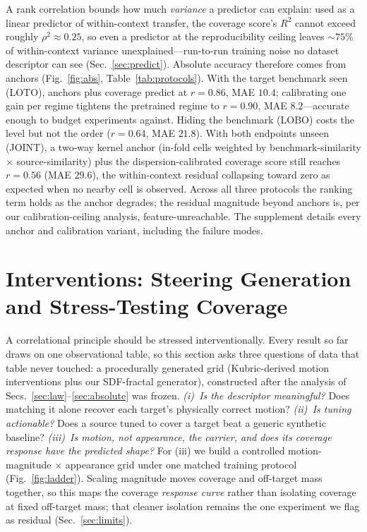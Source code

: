 \documentclass[runningheads]{llncs}
\begin{document}
A rank correlation bounds how much \emph{variance} a predictor can explain: used
as a linear predictor of within-context transfer, the coverage score's $R^2$
cannot exceed roughly $\rho^2 \approx 0.25$, so even a predictor at the
reproducibility ceiling leaves ${\sim}75\%$ of within-context variance
unexplained---run-to-run training noise no dataset descriptor can see
(Sec.~\ref{sec:predict}). Absolute accuracy therefore comes from anchors
(Fig.~\ref{fig:abs}, Table~\ref{tab:protocols}). With the target benchmark seen
(LOTO), anchors plus coverage predict at $r{=}0.86$, MAE $10.4$; calibrating one
gain per regime tightens the pretrained regime to $r{=}0.90$, MAE
$8.2$---accurate enough to budget experiments against. Hiding the benchmark
(LOBO) costs the level but not the order ($r{=}0.64$, MAE $21.8$). With both
endpoints unseen (JOINT), a two-way kernel anchor (in-fold cells weighted by
benchmark-similarity $\times$ source-similarity) plus the dispersion-calibrated
coverage score still reaches $r{=}0.56$ (MAE $29.6$), the within-context residual
collapsing toward zero as expected when no nearby cell is observed. Across all
three protocols the ranking term holds as the anchor degrades; the residual
magnitude beyond anchors is, per our calibration-ceiling analysis,
feature-unreachable. The supplement details every anchor and calibration variant,
including the failure modes.

\section{Interventions: Steering Generation and Stress-Testing Coverage}
\label{sec:interv}

A correlational principle should be stressed interventionally. Every result so
far draws on one observational table, so this section asks three questions of
data that table never touched: a procedurally generated grid (Kubric-derived
motion interventions \cite{greff2021kubric} plus our SDF-fractal generator),
constructed after the analysis of Secs.~\ref{sec:law}--\ref{sec:absolute} was
frozen. \emph{(i)~Is the descriptor meaningful?} Does matching it alone recover
each target's physically correct motion? \emph{(ii)~Is tuning actionable?} Does
a source tuned to cover a target beat a generic synthetic baseline?
\emph{(iii)~Is motion, not appearance, the carrier, and does its coverage
response have the predicted shape?} For (iii) we build a controlled
motion-magnitude $\times$ appearance grid under one matched training protocol
(Fig.~\ref{fig:ladder}). Scaling magnitude moves coverage and off-target mass
together, so this maps the coverage \emph{response curve} rather than isolating
coverage at fixed off-target mass; that cleaner isolation remains the one
experiment we flag as residual (Sec.~\ref{sec:limits}).
\end{document}
